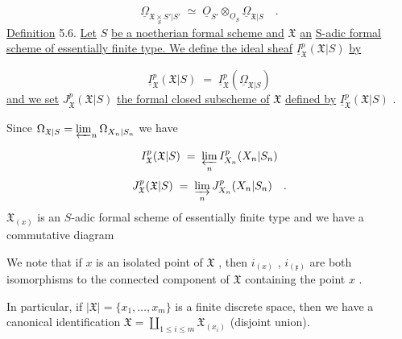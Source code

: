 \begin{equation*}
\underline{\Omega}_{\mathfrak{X} \underset{S}{\times} S'|S'} \;\simeq\; \underline{O}_{S'} \otimes_{\underline{O}_S} \underline{\Omega}_{\mathfrak{X}|S} \quad .
\end{equation*}
\underline{Definition} 5.6. \underline{Let} $S$ \underline{be a noetherian formal scheme and} $\mathfrak{X}$ \underline{an} \underline{S-adic formal scheme of essentially finite type. We define the ideal sheaf} $\underline{I}^p_{\mathfrak{X}}(\mathfrak{X}|S)$ \underline{by}

\begin{equation*}
\underline{I}^p_{\mathfrak{X}}(\mathfrak{X}|S) \;=\; \underline{I}^p_{\mathfrak{X}}(\underline{\Omega}_{\mathfrak{X}|S})
\end{equation*}
\underline{and we set} $J^p_{\mathfrak{X}}(\mathfrak{X}|S)$ \underline{the formal closed subscheme of} $\mathfrak{X}$ \underline{defined by} $\underline{I}^p_{\mathfrak{X}}(\mathfrak{X}|S)$ .

Since $\Omega_{\mathfrak{X}|S} = \varprojlim_{n} \Omega_{X_n|S_n}$ we have 



\begin{equation*}
 I^p_{\mathfrak{X}}(\mathfrak{X}|S) \;=\; \varprojlim_{n} I^p_{X_n}(X_n|S_n)
\end{equation*}
\begin{equation*}
J^p_{\mathfrak{X}}(\mathfrak{X}|S) \;=\; \varinjlim_{n} J^p_{X_n}(X_n|S_n) \quad .
\end{equation*}
$\mathfrak{X}_{(x)}$ is an $S$-adic formal scheme of essentially finite type and we have a commutative diagram

\begin{center}
\end{center}
We note that if $x$ is an isolated point of $\mathfrak{X}$ , then $i_{(x)}$ , $i_{(\mathfrak{x})}$ are both isomorphisms to the connected component of $\mathfrak{X}$ containing the point $x$ .

In particular, if $|\mathfrak{X}| = \{x_1,\dots,x_m\}$ is a finite discrete space, then we have a canonical identification $\mathfrak{X} = \coprod_{1 \leq i \leq m} \mathfrak{X}_{(x_i)}$ (disjoint union).

